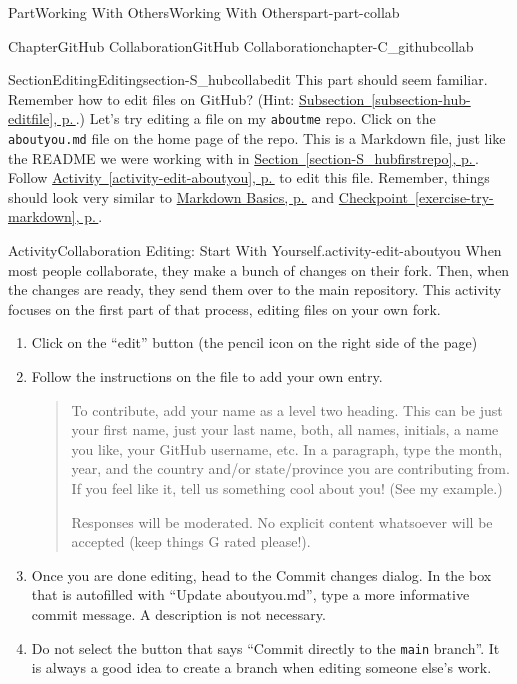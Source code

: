 \documentclass[twoside,10pt,]{book}
\newcommand{\xreffont}{\relax}
\newcommand{\mono}[1]{\texttt{#1}}
\begin{document}
\begin{partptx}{Part}{Working With Others}{}{Working With Others}{}{}{part-part-collab}
\begin{chapterptx}{Chapter}{GitHub Collaboration}{}{GitHub Collaboration}{}{}{chapter-C_githubcollab}
\begin{sectionptx}{Section}{Editing}{}{Editing}{}{}{section-S_hubcollabedit}
This part should seem familiar. Remember how to edit files on GitHub? (Hint: \hyperref[subsection-hub-editfile]{Subsection~{\xreffont\ref{subsection-hub-editfile}}, p.\,\pageref{subsection-hub-editfile}}.) Let's try editing a file on my \mono{aboutme} repo. Click on the \mono{aboutyou.md} file on the home page of the repo. This is a Markdown file, just like the README we were working with in \hyperref[section-S_hubfirstrepo]{Section~{\xreffont\ref{section-S_hubfirstrepo}}, p.\,\pageref{section-S_hubfirstrepo}}. Follow \hyperref[activity-edit-aboutyou]{Activity~{\xreffont\ref{activity-edit-aboutyou}}, p.\,\pageref{activity-edit-aboutyou}} to edit this file. Remember, things should look very similar to \hyperref[assemblage-markdown]{Markdown Basics, p.\,\pageref{assemblage-markdown}} and \hyperref[exercise-try-markdown]{Checkpoint~{\xreffont\ref{exercise-try-markdown}}, p.\,\pageref{exercise-try-markdown}}.%
\begin{activity}{Activity}{Collaboration Editing: Start With Yourself.}{activity-edit-aboutyou}%
When most people collaborate, they make a bunch of changes on their fork. Then, when the changes are ready, they send them over to the main repository. This activity focuses on the first part of that process, editing files on your own fork.%
\begin{enumerate}[font=\bfseries,label=(\alph*),ref=\alph*]%
\item{}Click on the ``edit'' button (the pencil icon on the right side of the page)%
\item{}Follow the instructions on the file to add your own entry.%
\begin{quote}%
To contribute, add your name as a level two heading. This can be just your first name, just your last name, both, all names, initials, a name you like, your GitHub username, etc. In a paragraph, type the month, year, and the country and\slash{}or state\slash{}province you are contributing from. If you feel like it, tell us something cool about you! (See my example.)%
\par
Responses will be moderated. No explicit content whatsoever will be accepted (keep things G rated please!).%
\end{quote}
\item{}Once you are done editing, head to the Commit changes dialog. In the box that is autofilled with ``Update aboutyou.md'', type a more informative commit message. A description is not necessary.%
\item{}Do not select the button that says ``Commit directly to the \mono{main} branch''. It is always a good idea to create a branch when editing someone else's work.%

\end{enumerate}
\end{activity}
\end{sectionptx}
\end{chapterptx}
\end{partptx}
\end{document}
